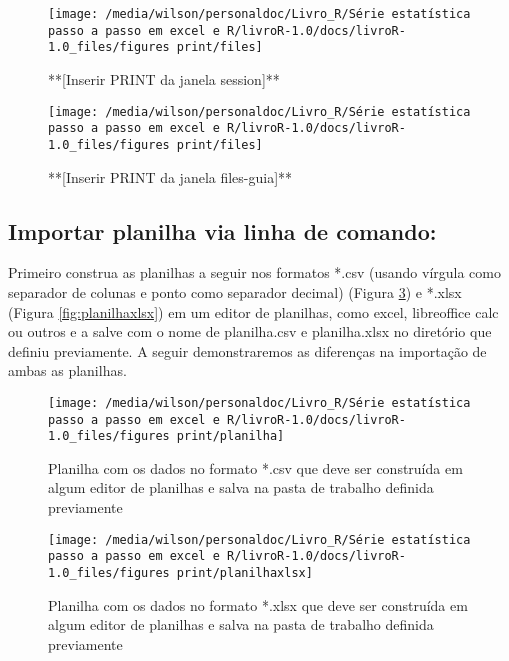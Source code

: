 \documentclass[titlepage, oneside, openany, a4paper]{book}
\begin{document}
\begin{figure}

{\centering \texttt{[image: /media/wilson/personaldoc/Livro\_R/Série estatística passo a passo em excel e R/livroR-1.0/docs/livroR-1.0\_files/figures print/files]} 

}

\caption{**[Inserir PRINT da janela session]**}\label{fig:mode-2}
\end{figure}

\begin{figure}

{\centering \texttt{[image: /media/wilson/personaldoc/Livro\_R/Série estatística passo a passo em excel e R/livroR-1.0/docs/livroR-1.0\_files/figures print/files]} 

}

\caption{**[Inserir PRINT da janela files-guia]**}\label{fig:files-guia}
\end{figure}

\hypertarget{importar-planilha-via-linha-de-comando}{%
\subsection{Importar planilha via linha de comando:}\label{importar-planilha-via-linha-de-comando}}

Primeiro construa as planilhas a seguir nos formatos *.csv (usando vírgula como separador de colunas e ponto como separador decimal) (Figura \ref{fig:planilha}) e *.xlsx (Figura \ref{fig:planilhaxlsx}) em um editor de planilhas, como excel, libreoffice calc ou outros e a salve com o nome de planilha.csv e planilha.xlsx no diretório que definiu previamente. A seguir demonstraremos as diferenças na importação de ambas as planilhas.

\begin{figure}

{\centering \texttt{[image: /media/wilson/personaldoc/Livro\_R/Série estatística passo a passo em excel e R/livroR-1.0/docs/livroR-1.0\_files/figures print/planilha]} 

}

\caption{Planilha com os dados no formato *.csv que deve ser construída em algum editor de planilhas e salva na pasta de trabalho definida previamente}\label{fig:planilha}
\end{figure}

\begin{figure}

{\centering \texttt{[image: /media/wilson/personaldoc/Livro\_R/Série estatística passo a passo em excel e R/livroR-1.0/docs/livroR-1.0\_files/figures print/planilhaxlsx]} 

}

\caption{Planilha com os dados no formato *.xlsx que deve ser construída em algum editor de planilhas e salva na pasta de trabalho definida previamente}\label{fig:planlhaxlsx}
\end{figure}
\end{document}
